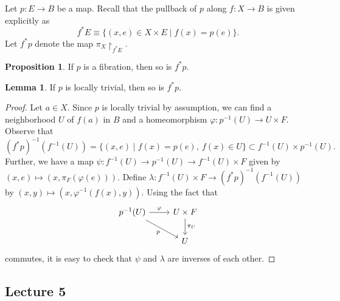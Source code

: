 \documentclass[10pt,letterpaper,cm]{nupset}
\theoremstyle{definition}
\theoremstyle{theorem}
\newtheorem{lemma}[defn]{Lemma}
\newtheorem{prop}[defn]{Proposition}
\theoremstyle{remark}
\newcommand{\1}{\mathbb{1}}
\newcommand{\0}{\vec 0}
\begin{document}
Let $p : E \to B$ be a map. Recall that the pullback of $p$ along $f : X \to B$ is given explicitly as   $$f^{\ast}{E} \equiv \{(x, e) \in X \times E \mid f(x) = p(e)\}.$$  Let  $f^{\ast}{p}$ denote the map $\pi_X\restriction_{f^{\ast}{E}}$.

\begin{prop}
If $p$ is a fibration, then so is $f^{\ast}{p}$.
\end{prop}

\begin{lemma}\label{pbtriv}
If $p$ is locally trivial, then so is $f^{\ast}{p}$. 
\end{lemma}
\begin{proof}
Let $a \in X$. Since $p$ is locally trivial by assumption, we can find a neighborhood $U$ of $f(a)$ in $B$ and a homeomorphism $\varphi : p^{-1}(U) \to U \times F$. Observe that 
\[
(f^{\ast}{p})^{-1}(f^{-1}(U)) = \{(x,e) \mid f(x) = p(e), \ f(x) \in U\} \subset f^{-1}(U) \times p^{-1}(U).
\] Further, we have a map $\psi : f^{-1}(U) \to p^{-1}(U) \to f^{-1}(U) \times F$ given by $(x,e) \mapsto (x, \pi_F(\varphi(e)))$. Define $\lambda : f^{-1}(U) \times F \to (f^{\ast}{p})^{-1}(f^{-1}(U))$ by $(x,y) \mapsto (x, \varphi^{-1}(f(x), y))$. Using the fact that 
\[
\begin{tikzcd}
p^{-1}(U) \arrow[r, "\varphi"] \arrow[rd, "p"'] & U\times F \arrow[d, "\pi_U"] \\
                                                    & U                           
\end{tikzcd}
\] commutes, it is easy to check that $\psi$ and $\lambda$ are inverses of each other. 
\end{proof}



\subsection{Lecture 5}
\end{document}
